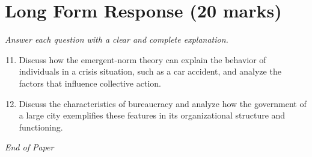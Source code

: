 \documentclass[12pt]{article}
\begin{document}
\section*{Long Form Response (20 marks)}
\textit{Answer each question with a clear and complete explanation.}
\begin{enumerate}[label=\arabic*.]
\setcounter{enumi}{10}
\item Discuss how the emergent-norm theory can explain the behavior of individuals in a crisis situation, such as a car accident, and analyze the factors that influence collective action.
\item Discuss the characteristics of bureaucracy and analyze how the government of a large city exemplifies these features in its organizational structure and functioning.
\end{enumerate}

\vfill
\noindent\textit{End of Paper}
\end{document}
